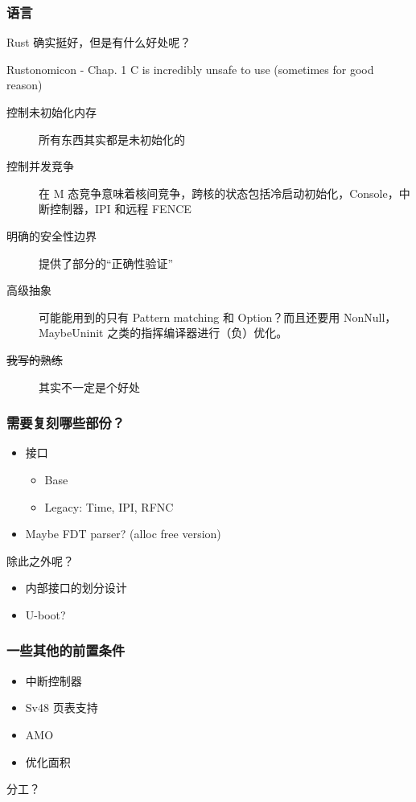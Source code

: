 \documentclass[UTF-8]{ctexbeamer}
\begin{document}
\begin{frame}
  \frametitle{语言}
  Rust 确实挺好，但是有什么好处呢？

  \begin{block}{Rustonomicon - Chap. 1}
    C is incredibly unsafe to use (sometimes for good reason)
  \end{block}

  \vspace{1em}
  \pause

  \begin{description}
    \item[控制未初始化内存] 所有东西其实都是未初始化的
    \item[控制并发竞争] 在 M 态竞争意味着核间竞争，跨核的状态包括冷启动初始化，Console，中断控制器，IPI 和远程 FENCE
    \item[明确的安全性边界] 提供了部分的“正确性验证”
    \pause
    \item[高级抽象] 可能能用到的只有 Pattern matching 和 Option？而且还要用 NonNull，MaybeUninit 之类的指挥编译器进行（负）优化。
    \pause
    \item[\sout{我写的熟练}] 其实不一定是个好处
  \end{description}
\end{frame}

\begin{frame}
  \frametitle{需要复刻哪些部份？}
  \begin{itemize}
    \item 接口
    \begin{itemize}
      \item Base
      \item Legacy: Time, IPI, RFNC
    \end{itemize}
    \item Maybe FDT parser? (alloc free version)
  \end{itemize}

  \pause
  \pause
  \vspace{1em}
  除此之外呢？
  \begin{itemize}
    \item 内部接口的划分设计
    \item U-boot?
  \end{itemize}
\end{frame}
\begin{frame}
  \frametitle{一些其他的前置条件}
  \begin{itemize}
    \item 中断控制器
    \item Sv48 页表支持
    \item AMO
    \item 优化面积
  \end{itemize}

  \pause

  \vspace{1em}
  分工？
\end{frame}
\end{document}
